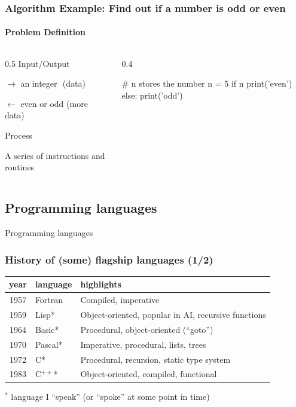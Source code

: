 \documentclass[xcolor=x11names,handout]{beamer}
\begin{document}
\begin{frame}[fragile]
\frametitle{Algorithm Example: Find out if a number is odd or even}
\framesubtitle{Problem Definition}
\begin{columns}

\begin{column}{0.5\textwidth}
\alert{Input/Output}

$\rightarrow$ an integer\,\,\,\,(data)

$\leftarrow$ even or odd 	(more data)	\pause

\bigskip
\alert{Process}

A series of instructions and routines
\end{column}

\begin{column}{0.4\textwidth}

\begin{python}
# n stores the number
n = 5
if n%
 	print('even')
else:
 	print('odd')
\end{python}

\end{column}
\end{columns}
\end{frame}

\begin{frame}
\section{Programming languages}
\centering
\alert{Programming languages}
\end{frame}

\begin{frame}
\frametitle{History of (some) flagship languages (1/2)}

\begin{center}
\begin{tabular}{clp{79mm}}
\hline
\bf year	& \bf language	& \bf highlights	\\
\hline
1957	& Fortran	& Compiled, imperative	\\
1959	& Lisp*		& Object-oriented, popular in AI, recursive functions	\\
1964	& Basic*	& Procedural, object-oriented (``goto'')	\\
1970	& Pascal*	& Imperative, procedural, lists, trees	\\
1972	& C*		& Procedural, recursion, static type system	\\
1983	& C$^{++}$*		& Object-oriented, compiled, functional	\\
\hline
\end{tabular}
\end{center}

\bigskip
$^*$ language I ``speak'' (or ``spoke'' at some point in time)
\end{frame}
\end{document}
